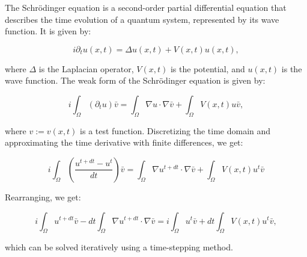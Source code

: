 \documentclass{article}
\begin{document}
The Schrödinger equation is a second-order partial differential equation that describes the time evolution of a quantum system, represented by its wave function. It is given by:

\begin{equation}
    i \partial_t u(x,t) = \Delta u(x,t) + V(x,t) u(x,t),
\end{equation}

where $\Delta$ is the Laplacian operator, $V(x,t)$ is the potential, and $u(x,t)$ is the wave function. The weak form of the Schrödinger equation is given by:

\begin{equation}
    i \int_{\Omega} \left( \partial_t u \right) \bar{v} = \int_{\Omega} \nabla u \cdot \nabla \bar{v} + \int_{\Omega} V(x,t) u \bar{v},
\end{equation}

where $v := v(x,t)$ is a test function. Discretizing the time domain and approximating the time derivative with finite differences, we get:

\begin{equation}
    i \int_{\Omega} \left( \frac{u^{t + dt} - u^t}{dt} \right) \bar{v} = \int_{\Omega} \nabla u^{t + dt} \cdot \nabla \bar{v} + \int_{\Omega} V(x,t) u^t \bar{v}
\end{equation}

Rearranging, we get:

\begin{equation}
    i \int_{\Omega} u^{t + dt} \bar{v} - dt \int_{\Omega} \nabla u^{t + dt} \cdot \nabla \bar{v} = i \int_{\Omega} u^t \bar{v} + dt \int_{\Omega} V(x,t) u^t \bar{v},
\end{equation}

which can be solved iteratively using a time-stepping method.
\end{document}
